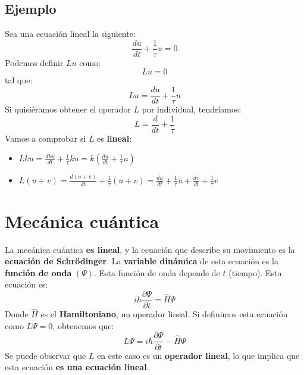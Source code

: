 \documentclass{article}
\begin{document}
\subsection*{Ejemplo}
Sea una ecuación lineal la siguiente:
\[
    \frac{du}{dt}+ \frac{1}{\tau}u=0
\]
Podemos definir $Lu$ como:
\[
    Lu=0
\]
tal que:
\[
    Lu=\frac{du}{dt}+ \frac{1}{\tau}u
\]
Si quisiéramos obtener el operador $L$ por individual, tendríamos:
\[
    L= \frac{d}{dt} +\frac{1}{\tau}
\]
Vamos a comprobar si $L$ es \textbf{lineal}:
\begin{itemize}
    \item $L ku =\frac{dku}{dt} + \frac{1}{\tau}ku= k(\frac{du}{dt}+ \frac{1}{\tau}u)$ \checkmark
    \item $L(u+v)=\frac{d(u+v)}{dt}+ \frac{1}{\tau}(u+v)=\frac{du}{dt}+ \frac{1}{\tau}u+\frac{dv}{dt}+ \frac{1}{\tau}v\:$ \checkmark
\end{itemize}
\pagebreak
\section*{Mecánica cuántica}
La mecánica cuántica \textbf{es lineal}, y la ecuación que describe su movimiento 
es la \textbf{ecuación de Schrödinger}. La \textbf{variable dinámica}  de esta ecuación 
es la \textbf{función de onda} $(\Psi)$. Esta función de onda depende de $t$ (tiempo). Esta ecuación es:
\[
    i\hbar \frac{\partial\Psi}{\partial t}=\hat{H}\Psi
\]
Donde $\hat{H}$ es el \textbf{Hamiltoniano}, un operador lineal.
Si definimos esta ecuación como $L \Psi=0$, obtenemos que:
\[
    L \Psi =i\hbar \frac{\partial\Psi}{\partial t}- \hat{H}\Psi
\]
Se puede observar que $L$ en este caso es un \textbf{operador lineal}, lo que implica que esta ecuación \textbf{es una ecuación lineal}.
\pagebreak
\end{document}
